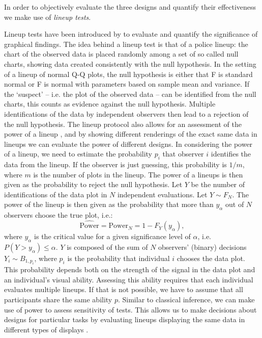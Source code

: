 \documentclass{article}\usepackage[]{graphicx}\usepackage[]{color}
\begin{document}
In order to objectively evaluate  the three designs and quantify their effectiveness we make use of {\it lineup tests}.

Lineup tests have been introduced by \citet{buja:2009hp} to evaluate and quantify the significance of graphical findings. The idea behind a lineup test is that of a police lineup: the chart of the observed data is placed randomly among a set of so called null charts, showing data created consistently with the null hypothesis. In the setting of a lineup of normal Q-Q plots, the null hypothesis  is either that F is standard normal or F is normal with parameters based on sample mean and variance.
If the `suspect' -- i.e. the plot of the observed data -- can be identified from the null charts, this counts as evidence against the null hypothesis. Multiple identifications of the data by independent observers then lead to a rejection of the null hypothesis. 
The lineup protocol also allows for an assessment of the power of a lineup \citep{mahbub:2013},  
and by showing different renderings of the exact same data in lineups we can evaluate the power  of different designs.
In considering the power of a lineup, we need to estimate the probability $p_i$ that observer $i$ identifies the data from the lineup. If the observer is just guessing, this probability is $1/m$, where $m$ is the number of plots in the lineup.
The power of a lineups is then given as the probability to reject the null hypothesis. Let $Y$ be the number of identifications of the data plot in $N$ independent evaluations. Let $Y \sim F_N$. The power of the lineup is then given as the probability that more than $y_\alpha$ out of $N$ observers
choose the true plot, i.e.:
\begin{equation}\label{eqn:power}
\widehat{\text{Power}} = \text{Power}_{N} = 1 - F_{Y} (y_{\alpha}),
\end{equation}
where $y_\alpha$ is the critical value for a given significance level of $\alpha$, i.e.~$P(Y >  y_{\alpha}) \le \alpha$. $Y$ is composed of the sum of $N$ observers' (binary) decisions $Y_i \sim B_{1, p_i}$, where  $p_i$ is the probability that individual $i$ chooses the data plot. This probability  depends both on the strength of the signal in the data plot and an individual's visual ability.
Assessing this ability requires that each individual evaluates multiple lineups. 
If that is not possible, we have to assume that all participants share the same ability $p$. %
Similar to classical inference, we can make use of power to assess sensitivity of tests. This allows us to make decisions about designs for particular tasks by evaluating lineups displaying  the same data in different types of displays \citep{Hofmann:2012ts}. 
\end{document}
